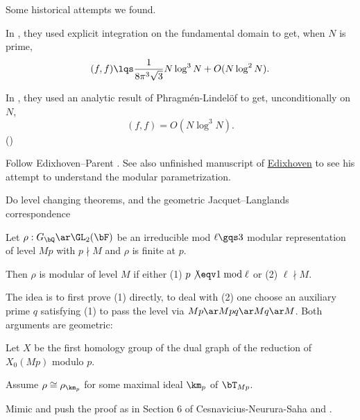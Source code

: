 \documentclass[article, a4paper, twoside]{universal}
\begin{document}
\begin{rmk}
	Some historical attempts we found.
	\begin{itm}
		\item In \cite[(12)]{Zagier1985Parametrization}, they used explicit integration on the fundamental domain to get, when $N$ is prime,
		\[
			(f,f)\lqs\frac{1}{8\pi^{3}\sqrt{3}}N\log^{3}{N}+O(N\log^{2}{N}).
		\]
		\item In \cite{MM1994Modular}, they used an analytic result of Phragm{\'e}n-Lindel{\" o}f to get, unconditionally on $N$,
		\[
			(f,f)=O(N\log^{3}{N}).
		\]
		()
	\end{itm}
\end{rmk}

Follow Edixhoven--Parent \cite{EP2021}. See also unfinished manuscript of \href{https://websites.math.leidenuniv.nl/edixhoven/publications/2001/modular_parametrisations.pdf}{Edixhoven} to see his attempt to understand the modular parametrization.



Do level changing theorems, and the geometric Jacquet--Langlands correspondence
\begin{thm}
	Let $\rho:G_{\bQ}\ar\GL_{2}(\bF)$ be an irreducible mod $\ell\gqs3$ modular representation of level $Mp$ with $p\nmid M$ and $\rho$ is finite at $p$.

	Then $\rho$ is modular of level $M$ if either (1) $p\not\eqv1\bmod{\ell}$ or (2) $\ell\nmid M$.
\end{thm}
\begin{prf}
	The idea is to first prove (1) directly, to deal with (2) one choose an auxiliary prime $q$ satisfying (1) to pass the level via $Mp\ar Mpq\ar Mq\ar M$. Both arguments are geometric:

	 Let $X$ be the first homology group of the dual graph of the reduction of $X_{0}(Mp)$ modulo $p$.



	Assume $\rho\cong\rho_{\km_{p}}$ for some maximal ideal $\km_{p}$ of $\bT_{Mp}$.
\end{prf}





Mimic and push the proof as in Section 6 of Cesnavicius-Neurura-Saha and \cite{Raynaud1991}.



\printref
\end{document}
